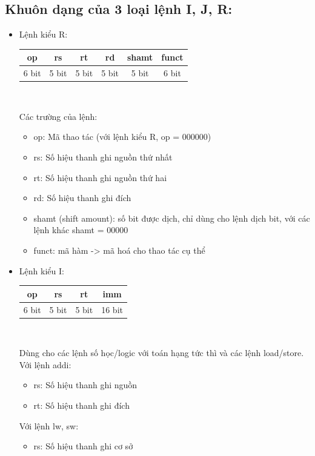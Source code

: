 \documentclass[12pt,a4paper,oneside]{article}
\begin{document}
\subsection{Khuôn dạng của 3 loại lệnh I, J, R:}

\begin{itemize}
\item Lệnh kiểu R:\\
\begin{center}
\begin{tabular}{|c|c|c|c|c|c|}
\hline 
op & rs & rt & rd & shamt & funct \\ 
\hline 
6 bit & 5 bit & 5 bit & 5 bit & 5 bit & 6 bit \\ 
\hline 
\end{tabular} \\
\end{center}
Các trường của lệnh:
	\begin{itemize}
	\item op: Mã thao tác (với lệnh kiểu R, op = 000000)
	\item rs: Số hiệu thanh ghi nguồn thứ nhất
	\item rt: Số hiệu thanh ghi nguồn thứ hai
	\item rd: Số hiệu thanh ghi đích
	\item shamt (shift amount): số bit được dịch, chỉ dùng cho lệnh dịch bit, với các lệnh khác shamt = 00000
	\item funct: mã hàm -> mã hoá cho thao tác cụ thể
	\end{itemize}
\item Lệnh kiểu I:\\
\begin{center}
\begin{tabular}{|c|c|c|c|}
\hline 
op & rs & rt & imm \\ 
\hline 
6 bit & 5 bit & 5 bit & 16 bit \\ 
\hline 
\end{tabular} \\
\end{center}
Dùng cho các lệnh số học/logic với toán hạng tức thì và các lệnh load/store.\\
Với lệnh addi:
	\begin{itemize}
	\item rs: Số hiệu thanh ghi nguồn
	\item rt: Số hiệu thanh ghi đích
	\end{itemize}
Với lệnh lw, sw:
	\begin{itemize}
	\item rs: Số hiệu thanh ghi cơ sở

\end{itemize}
\end{itemize}
\end{document}
